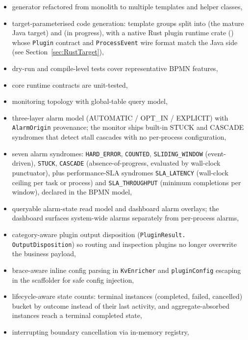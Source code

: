 \begin{itemize}
\item generator refactored from monolith to multiple templates and helper classes,
\item target-parameterised code generation: template groups split into
       (the mature Java target) and
       (in progress), with a native Rust plugin runtime
      crate () whose \texttt{Plugin} contract and
      \texttt{ProcessEvent} wire format match the Java side
      (see Section~\ref{sec:RustTarget}),
\item dry-run and compile-level tests cover representative BPMN features,
\item core runtime contracts are unit-tested,
\item monitoring topology with global-table query model,
\item three-layer alarm model (AUTOMATIC / OPT\_IN / EXPLICIT) with
      \texttt{AlarmOrigin} provenance; the monitor ships built-in STUCK and
      CASCADE syndromes that detect stall cascades with no per-process
      configuration,
\item seven alarm syndromes: \texttt{HARD\_ERROR}, \texttt{COUNTED},
      \texttt{SLIDING\_WINDOW} (event-driven), \texttt{STUCK},
      \texttt{CASCADE} (absence-of-progress, evaluated by wall-clock
      punctuator), plus performance-SLA syndromes \texttt{SLA\_LATENCY}
      (wall-clock ceiling per task or process) and \texttt{SLA\_THROUGHPUT}
      (minimum completions per window), declared in the BPMN model,
\item queryable alarm-state read model and dashboard alarm overlays; the
      dashboard surfaces system-wide alarms separately from per-process
      alarms,
\item category-aware plugin output disposition (\texttt{PluginResult.
      OutputDisposition}) so routing and inspection plugins no longer
      overwrite the business payload,
\item brace-aware inline config parsing in \texttt{KvEnricher} and
      \texttt{pluginConfig} escaping in the scaffolder for safe config
      injection,
\item lifecycle-aware state counts: terminal instances (completed, failed,
      cancelled) bucket by outcome instead of their last activity, and
      aggregate-absorbed instances reach a terminal completed state,
\item interrupting boundary cancellation via in-memory registry,

\end{itemize}
